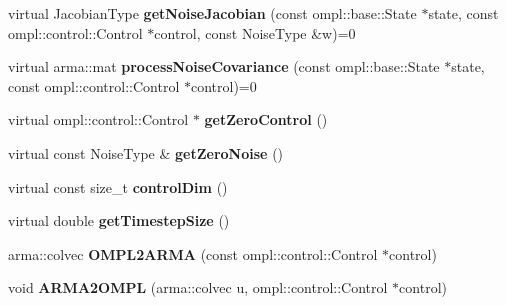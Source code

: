 \begin{DoxyCompactItemize}
\item 
\hypertarget{class_motion_model_method_adefbf482a8d6d409b262cb1af014026a}{virtual \-Jacobian\-Type {\bfseries get\-Noise\-Jacobian} (const ompl\-::base\-::\-State $\ast$state, const ompl\-::control\-::\-Control $\ast$control, const \-Noise\-Type \&w)=0}\label{class_motion_model_method_adefbf482a8d6d409b262cb1af014026a}

\item 
\hypertarget{class_motion_model_method_a559dc48932d5aca3215e3f24e29680ce}{virtual arma\-::mat {\bfseries process\-Noise\-Covariance} (const ompl\-::base\-::\-State $\ast$state, const ompl\-::control\-::\-Control $\ast$control)=0}\label{class_motion_model_method_a559dc48932d5aca3215e3f24e29680ce}

\item 
\hypertarget{class_motion_model_method_a4002e8e3bb3af13d56bc162b655a1543}{virtual ompl\-::control\-::\-Control $\ast$ {\bfseries get\-Zero\-Control} ()}\label{class_motion_model_method_a4002e8e3bb3af13d56bc162b655a1543}

\item 
\hypertarget{class_motion_model_method_a56d9a853b4ec8158c4c9016614c86a9f}{virtual const \-Noise\-Type \& {\bfseries get\-Zero\-Noise} ()}\label{class_motion_model_method_a56d9a853b4ec8158c4c9016614c86a9f}

\item 
\hypertarget{class_motion_model_method_ad0012e93feba030fa8e9a47a18c6ff0e}{virtual const size\-\_\-t {\bfseries control\-Dim} ()}\label{class_motion_model_method_ad0012e93feba030fa8e9a47a18c6ff0e}

\item 
\hypertarget{class_motion_model_method_a86ef6178a4d438fde83f1c3f110ad2b4}{virtual double {\bfseries get\-Timestep\-Size} ()}\label{class_motion_model_method_a86ef6178a4d438fde83f1c3f110ad2b4}

\item 
\hypertarget{class_motion_model_method_a924d7bb8eb665d12181c3755e831bc50}{arma\-::colvec {\bfseries \-O\-M\-P\-L2\-A\-R\-M\-A} (const ompl\-::control\-::\-Control $\ast$control)}\label{class_motion_model_method_a924d7bb8eb665d12181c3755e831bc50}

\item 
\hypertarget{class_motion_model_method_af473fd665c4fa562143beef5733db523}{void {\bfseries \-A\-R\-M\-A2\-O\-M\-P\-L} (arma\-::colvec u, ompl\-::control\-::\-Control $\ast$control)}\label{class_motion_model_method_af473fd665c4fa562143beef5733db523}

\end{DoxyCompactItemize}
